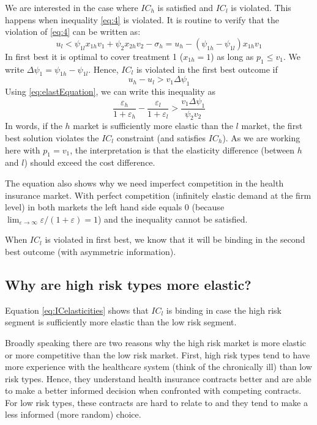 \documentclass[a4paper,12pt]{article}
\begin{document}
We are interested in the case where \(IC_h\) is satisfied and \(IC_l\) is violated. This happens when inequality \eqref{eq:4} is violated. It is routine to verify that the violation of \eqref{eq:4} can be written as:
\begin{equation}
\label{eq:1}
u_l < \psi_{1l}x_{1h}v_1 + \psi_2x_{2h}v_2 -\sigma_h = u_h - (\psi_{1h}-\psi_{1l})x_{1h} v_1
\end{equation}
In first best it is optimal to cover treatment 1 (\(x_{1h}=1\)) as long as \(p_1 \leq v_1\). We write \(\Delta \psi_1 = \psi_{1h} - \psi_{1l}\). Hence, \(IC_l\) is violated in the first best outcome if
\begin{equation}
u_h - u_l > v_1 \Delta \psi_1
\end{equation}
Using \eqref{eq:elastEquation}, we can write this inequality as
\begin{equation}
\label{eq:ICelasticities}
\frac{\varepsilon_{h}}{1+\varepsilon_{h}} - \frac{\varepsilon_{l}}{1+\varepsilon_{l}} > \frac{v_{1} \Delta\psi_1}{\psi_2 v_2}
\end{equation}
In words, if the \(h\) market is sufficiently more elastic than the \(l\) market, the first best solution violates the \(IC_l\) constraint (and satisfies \(IC_h\)). As we are working here with \(p_1=v_1\), the interpretation is that the elasticity difference (between \(h\) and \(l\)) should exceed the cost difference.

The equation also shows why we need imperfect competition in the health insurance market. With perfect competition (infinitely elastic demand at the firm level) in both markets the left hand side equals 0 (because \(\lim_{\varepsilon \rightarrow \infty} \varepsilon/(1+\varepsilon) = 1\)) and the inequality cannot be satisfied.

When \(IC_l\) is violated in first best, we know that it will be binding in the second best outcome (with asymmetric information).


\subsection{Why are high risk types more elastic?}
\label{sec:org63b3bc6}

Equation \eqref{eq:ICelasticities} shows that \(IC_l\) is binding in case the high risk segment is sufficiently more elastic than the low risk segment.

Broadly speaking there are two reasons why the high risk market is more elastic or more competitive than the low risk market. First, high risk types tend to have more experience with the healthcare system (think of the chronically ill) than low risk types. Hence, they understand health insurance contracts better and are able to make a better informed decision when confronted with competing contracts. For low risk types, these contracts are hard to relate to and they tend to make a less informed (more random) choice.
\end{document}
